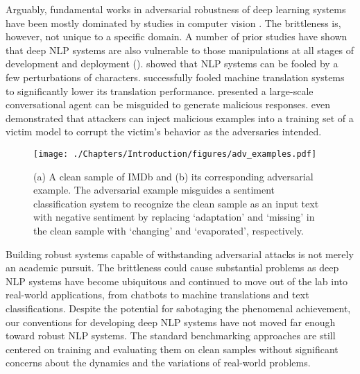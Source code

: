 Arguably, fundamental works in adversarial robustness of deep learning systems have been mostly dominated by studies in computer vision \citep{Ilyas2019,zhang2019theoretically,Cohen19_RS}. The brittleness is, however, not unique to a specific domain. A number of prior studies have shown that deep NLP systems are also vulnerable to those manipulations at all stages of development and deployment \citep{Ebrahimi2018-hotflip,alzantot-etal-2018-generating,EmmaZhang2019,krishna2020thieves,tan-etal-2020-morphin,wallace-etal-2021-concealed,Wallace2019Triggers} (\cf {}). \citet{Ebrahimi2018-hotflip} showed that NLP systems can be fooled by a few perturbations of characters. \citet{zou-etal-2020-reinforced} successfully fooled machine translation systems to significantly lower its translation performance. \citet{Liu2023JailbreakingCV} presented a large-scale conversational agent \citep{chatgpt} can be misguided to generate malicious responses. \citet{wallace-etal-2021-concealed} even demonstrated that attackers can inject malicious examples into a training set of a victim model to corrupt the victim's behavior as the adversaries intended.

\begin{figure}[t]
	\centering
	\texttt{[image: ./Chapters/Introduction/figures/adv\_examples.pdf]}
	\caption{(a) A clean sample of IMDb \citep{imdb} and (b) its corresponding adversarial example. The adversarial example misguides a sentiment classification system to recognize the clean sample as an input text with negative sentiment by replacing `adaptation' and `missing' in the clean sample with `changing' and `evaporated', respectively.}
	\label{fig:adv_ex_text}
\end{figure}

Building robust systems capable of withstanding adversarial attacks is not merely an academic pursuit. The brittleness could cause substantial problems as deep NLP systems have become ubiquitous and continued to move out of the lab into real-world applications, from chatbots \citep{chatgpt} to machine translations and text classifications. Despite the potential for sabotaging the phenomenal achievement, our conventions for developing deep NLP systems have not moved far enough toward robust NLP systems. The standard benchmarking approaches are still centered on training and evaluating them on clean samples without significant concerns about the dynamics and the variations of real-world problems. 

